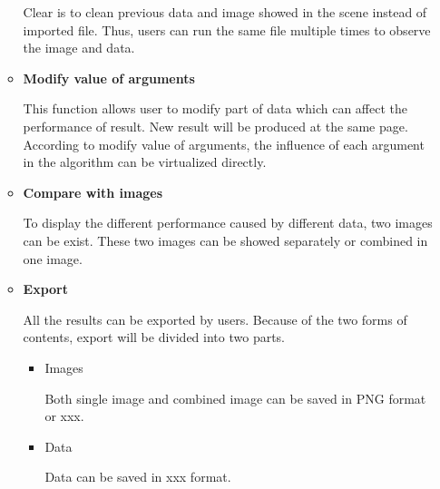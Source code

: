 \documentclass{article}
\begin{document}
\begin{itemize}
\begin{itemize}
          Clear is to clean previous data and image showed in the scene instead of imported file. Thus, users can run the same file multiple times to observe the image and data.
          \item \textbf{Modify value of arguments}

          This function allows user to modify part of data which can affect the performance of result. New result will be produced at the same page. According to modify value of arguments, the influence of each argument in the algorithm can be virtualized directly.
          \item \textbf{Compare with images}
          
          To display the different performance caused by different data, two images can be exist. These two images can be showed separately or combined in one image.  
          \item \textbf{Export}
          
          All the results can be exported by users. Because of the two forms of contents, export will be divided into two parts.  
          \begin{itemize}
            \item Images
            
            Both single image and combined image can be saved in PNG format or xxx. 
            \item Data
            
            Data can be saved in xxx format.
          \end{itemize}
       \end{itemize}
     \end{itemize}
\end{document}
